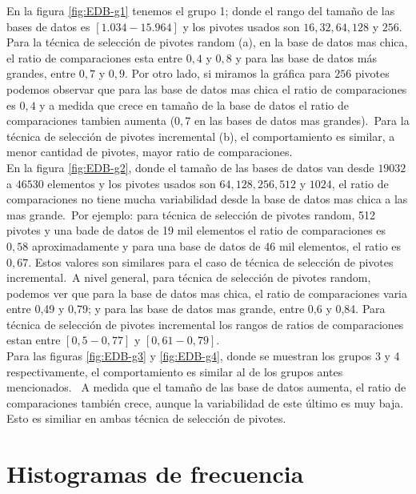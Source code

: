 En la figura \ref{fig:EDB-g1} tenemos el grupo 1; donde el rango del tama\~no de las bases de datos es $[1.034-15.964]$ y los pivotes usados son $16, 32, 64, 128$ y $256$. Para la t\'ecnica de selecci\'on de pivotes random (a), en la base de datos mas chica, el ratio de comparaciones esta entre $0,4$ y $0,8$ y para las base de datos m\'as grandes, entre $0,7$ y $0,9$. Por otro lado, si miramos la gr\'afica para $256$ pivotes podemos observar que para las base de datos mas chica el ratio de comparaciones es $0,4$ y a medida que crece en tama\~no de la base de datos el ratio de comparaciones tambien aumenta ($0,7$ en las bases de datos mas grandes).\
Para la t\'ecnica de selecci\'on de pivotes incremental (b), el comportamiento es similar, a menor cantidad de pivotes, mayor ratio de comparaciones.\\

En la figura \ref{fig:EDB-g2}, donde el tama\~no de las bases de datos van desde $19032$ a $46530$ elementos y los pivotes usados son $64, 128, 256, 512$ y $1024$, el ratio de comparaciones no tiene mucha variabilidad desde la base de datos mas chica a las mas grande.\
Por ejemplo: para t\'ecnica de selecci\'on de pivotes random, 512 pivotes y una bade de datos de 19 mil elementos el ratio de comparaciones es $0,58$ aproximadamente y para una base de datos de 46 mil elementos, el ratio es $0,67$. Estos valores son similares para el caso de t\'ecnica de selecci\'on de pivotes incremental.\
A nivel general, para t\'ecnica de selecci\'on de pivotes random, podemos ver que para la base de datos mas chica, el ratio de comparaciones varia entre 0,49 y 0,79; y para las base de datos mas grande, entre 0,6 y 0,84. Para t\'ecnica de selecci\'on de pivotes incremental los rangos de ratios de comparaciones estan entre $[0,5 - 0,77]$ y $[0,61 - 0,79]$. \\

Para las figuras \ref{fig:EDB-g3} y \ref{fig:EDB-g4}, donde se muestran los grupos 3 y 4 respectivamente, el comportamiento es similar al de los grupos antes mencionados.	\
A medida que el tama\~no de las base de datos aumenta, el ratio de comparaciones tambi\'en crece, aunque la variabilidad de este \'ultimo es muy baja. Esto es similiar en ambas  t\'ecnica de selecci\'on de pivotes.

 \section{Histogramas de frecuencia}\label{capitulo.H}
 
